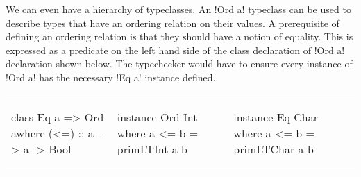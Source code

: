 \documentclass[format=sigplan,manuscript,review,screen,nonacm,margin=1in]{acmart}
\begin{document}
We can even have a hierarchy of typeclasses. An !Ord a! typeclass can be used to describe
types that have an ordering relation on their values. A prerequisite of defining an ordering relation
is that they should have a notion of equality. This is expressed as a predicate on the left hand side
of the class declaration of !Ord a! declaration shown below. The typechecker would
have to ensure every instance of !Ord a! has the necessary !Eq a! instance defined.
\begin{tabular}{l l l}
\begin{code}
class Eq a => Ord awhere
  (<=) :: a -> a -> Bool
\end{code}&%
\begin{code}
instance Ord Int where
  a <= b = primLTInt a b
\end{code}&%
\begin{code}
instance Eq Char where
  a <= b = primLTChar a b
\end{code}%
\end{tabular}
\end{document}
